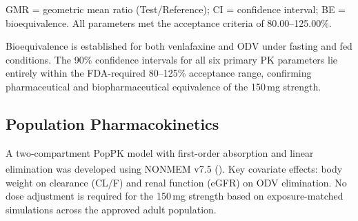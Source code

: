 {\small\vspace{1mm}GMR = geometric mean ratio (Test/Reference); CI = confidence interval; BE =
bioequivalence. All parameters met the acceptance criteria of 80.00--125.00\%.}

\vspace{3mm}
\begin{regnote}
Bioequivalence is established for both venlafaxine and ODV under fasting and fed conditions.
The 90\% confidence intervals for all six primary PK parameters lie entirely within the
FDA-required 80--125\% acceptance range, confirming pharmaceutical and biopharmaceutical
equivalence of the 150\,mg strength.
\end{regnote}

\subsection{Population Pharmacokinetics}
\label{sec:poppk}

A two-compartment PopPK model with first-order absorption and linear elimination was developed
using NONMEM\textsuperscript{\textregistered} v7.5 ().
Key covariate effects: body weight on clearance (CL/F) and renal function (eGFR) on ODV
elimination. No dose adjustment is required for the 150\,mg strength based on exposure-matched
simulations across the approved adult population.

